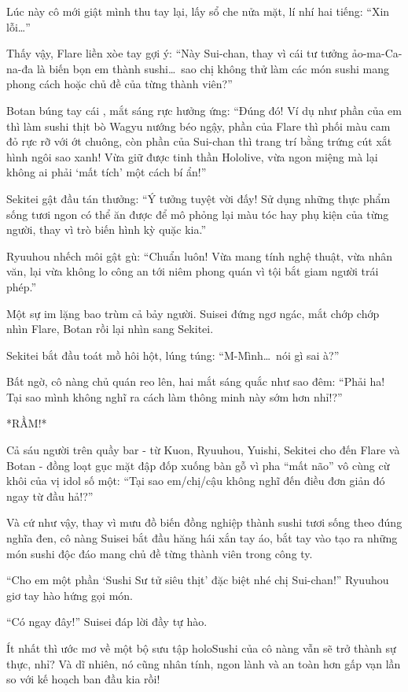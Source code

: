 \documentclass[../main.tex]{subfiles}
\begin{document}
Lúc này cô mới giật mình thu tay lại, lấy sổ che nửa mặt, lí nhí hai tiếng: ``Xin lỗi\dots''

Thấy vậy, Flare liền xòe tay gợi ý: ``Này Sui-chan, thay vì cái tư tưởng ảo-ma-Ca-na-đa là biến bọn em thành sushi\dots\ sao chị không thử làm các món sushi mang phong cách hoặc chủ đề của từng thành viên?''

Botan búng tay cái , mắt sáng rực hưởng ứng: ``Đúng đó! Ví dụ như phần của em thì làm sushi thịt bò Wagyu nướng béo ngậy, phần của Flare thì phối màu cam đỏ rực rỡ với ớt chuông, còn phần của Sui-chan thì trang trí bằng trứng cút xắt hình ngôi sao xanh! Vừa giữ được tinh thần Hololive, vừa ngon miệng mà lại không ai phải `mất tích' một cách bí ẩn!''

Sekitei gật đầu tán thưởng: ``Ý tưởng tuyệt vời đấy! Sử dụng những thực phẩm sống tươi ngon có thể ăn được để mô phỏng lại màu tóc hay phụ kiện của từng người, thay vì trò biến hình kỳ quặc kia.''

Ryuuhou nhếch môi gật gù: ``Chuẩn luôn! Vừa mang tính nghệ thuật, vừa nhân văn, lại vừa không lo công an tới niêm phong quán vì tội bắt giam người trái phép.''

Một sự im lặng bao trùm cả bảy người. Suisei đứng ngơ ngác, mắt chớp chớp nhìn Flare, Botan rồi lại nhìn sang Sekitei.

Sekitei bắt đầu toát mồ hôi hột, lúng túng: ``M-Mình\dots\ nói gì sai à?''

Bất ngờ, cô nàng chủ quán reo lên, hai mắt sáng quắc như sao đêm: ``Phải ha! Tại sao mình không nghĩ ra cách làm thông minh này sớm hơn nhỉ!?''

*RẦM!*

Cả sáu người trên quầy bar - từ Kuon, Ryuuhou, Yuishi, Sekitei cho đến Flare và Botan - đồng loạt gục mặt đập đốp xuống bàn gỗ vì pha ``mất não'' vô cùng cừ khôi của vị idol số một: ``Tại sao em/chị/cậu không nghĩ đến điều đơn giản đó ngay từ đầu hả!?''

Và cứ như vậy, thay vì mưu đồ biến đồng nghiệp thành sushi tươi sống theo đúng nghĩa đen, cô nàng Suisei bắt đầu hăng hái xắn tay áo, bắt tay vào tạo ra những món sushi độc đáo mang chủ đề từng thành viên trong công ty.

``Cho em một phần `Sushi Sư tử siêu thịt' đặc biệt nhé chị Sui-chan!'' Ryuuhou giơ tay hào hứng gọi món.

``Có ngay đây!'' Suisei đáp lời đầy tự hào.

Ít nhất thì ước mơ về một bộ sưu tập holoSushi của cô nàng vẫn sẽ trở thành sự thực, nhỉ? Và dĩ nhiên, nó cũng nhân tính, ngon lành và an toàn hơn gấp vạn lần so với kế hoạch ban đầu kia rồi!
\end{document}
